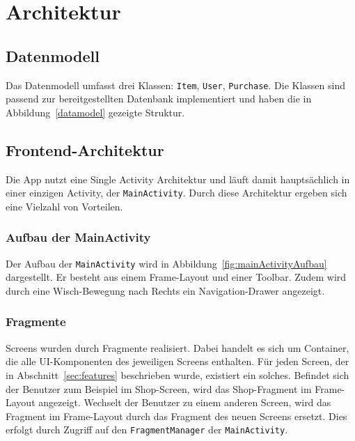 \section{Architektur}\label{sec:architecture}

\subsection{Datenmodell}\label{subsec:datamodel}

Das Datenmodell umfasst drei Klassen: \texttt{Item}, \texttt{User}, \texttt{Purchase}.
Die Klassen sind passend zur bereitgestellten Datenbank implementiert und haben die in Abbildung~\ref{datamodel} gezeigte Struktur.


\subsection{Frontend-Architektur}\label{subsec:frontend}
Die App nutzt eine Single Activity Architektur und läuft damit hauptsächlich in einer einzigen Activity, der \texttt{MainActivity}.
Durch diese Architektur ergeben sich eine Vielzahl von Vorteilen.

\subsubsection{Aufbau der MainActivity}

Der Aufbau der \texttt{MainActivity} wird in Abbildung~\ref{fig:mainActivityAufbau} dargestellt.
Er besteht aus einem Frame-Layout und einer Toolbar.
Zudem wird durch eine Wisch-Bewegung nach Rechts ein Navigation-Drawer angezeigt.

\subsubsection{Fragmente}

Screens wurden durch Fragmente realisiert.
Dabei handelt es sich um Container, die alle UI-Komponenten des jeweiligen Screens enthalten.
Für jeden Screen, der in Abschnitt~\ref{sec:features} beschrieben wurde, existiert ein solches.
Befindet sich der Benutzer zum Beispiel im Shop-Screen, wird das Shop-Fragment im Frame-Layout angezeigt.
Wechselt der Benutzer zu einem anderen Screen, wird das Fragment im Frame-Layout durch das Fragment des neuen Screens ersetzt.
Dies erfolgt durch Zugriff auf den \texttt{FragmentManager} der \texttt{MainActivity}.

